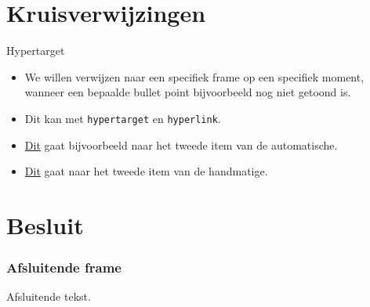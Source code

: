 \documentclass
[kulak] %
{kulakbeamer}
\begin{document}
	\section{Kruisverwijzingen}
	
	\begin{frame}{Hypertarget}
		\begin{itemize}
			\item We willen verwijzen naar een specifiek frame op een specifiek moment, wanneer een bepaalde bullet point bijvoorbeeld nog niet getoond is.
			
			\item Dit kan met \texttt{hypertarget} en \texttt{hyperlink}.
			
			\item \hyperlink{targetlabel}{Dit} gaat bijvoorbeeld naar het tweede item van de automatische.
			
			\item \hyperlink{targetlabel2}{Dit} gaat naar het tweede item van de handmatige.
		\end{itemize}
	\end{frame}
	
	\section{Besluit}
	\begin{frame}
		\frametitle{Afsluitende frame}
		Afsluitende tekst.
	\end{frame}
	
\end{document}
